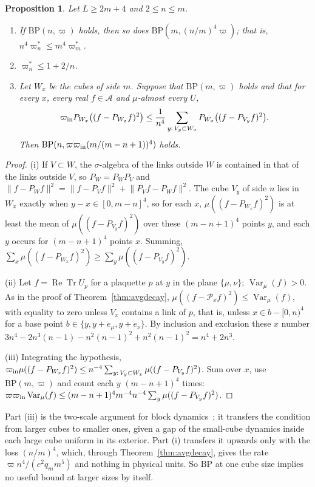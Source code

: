 \documentclass[aps,prd,twocolumn,superscriptaddress,nofootinbib,longbibliography,floatfix,amsmath,amssymb,10pt]{revtex4-2}
\newtheorem{proposition}[theorem]{Proposition}
\theoremstyle{definition}
\theoremstyle{remark}
\newcommand{\ReTr}{\operatorname{Re}\operatorname{Tr}}
\newcommand{\Var}{\operatorname{Var}}
\begin{document}
\begin{proposition}\label{prop:bpscales}
Let $L\ge2m+4$ and $2\le n\le m$.
\begin{enumerate}[label=\textup{(\roman*)},leftmargin=*]
\item If $\mathrm{BP}(n,\varpi)$ holds, then so does $\mathrm{BP}(m,(n/m)^4
\varpi)$; that is, $n^4\varpi^*_n\le m^4\varpi^*_m$.
\item $\varpi^*_n\le1+2/n$.
\item Let $W_x$ be the cubes of side $m$. Suppose that $\mathrm{BP}(m,
\varpi)$ holds and that for every $x$, every real $f\in\mathcal A$ and
$\mu$-almost every $U$,
\[
\varpi_{\rm in}P_{W_x}\bigl((f-P_{W_x}f)^2\bigr)\le\frac1{n^4}\sum_{y:\,V_y
\subset W_x}P_{W_x}\bigl((f-P_{V_y}f)^2\bigr).
\]
Then $\mathrm{BP}(n,\varpi\varpi_{\rm in}(m/(m-n+1))^4)$ holds.
\end{enumerate}
\end{proposition}

\begin{proof}
(i) If $V\subset W$, the $\sigma$-algebra of the links outside $W$ is
contained in that of the links outside $V$, so $P_W=P_WP_V$ and
$\lVert f-P_Wf\rVert^2=\lVert f-P_Vf\rVert^2+\lVert P_Vf-P_Wf\rVert^2$. The
cube $V_y$ of side $n$ lies in $W_x$ exactly when $y-x\in[0,m-n]^4$, so
for each $x$, $\mu((f-P_{W_x}f)^2)$ is at least the mean of $\mu((f-P_{V_y}
f)^2)$ over these $(m-n+1)^4$ points $y$, and each $y$ occurs for
$(m-n+1)^4$ points $x$. Summing, $\sum_x\mu((f-P_{W_x}f)^2)\ge\sum_y\mu((f-
P_{V_y}f)^2)$.

(ii) Let $f=\ReTr U_p$ for a plaquette $p$ at $y$ in the plane $\{\mu,\nu
\}$; $\Var_\mu(f)>0$. As in the proof of Theorem~\ref{thm:avgdecay},
$\mu((f-\mathcal P_xf)^2)\le\Var_\mu(f)$, with equality to zero unless $V_x$
contains a link of $p$, that is, unless $x\in b-[0,n)^4$ for a base point
$b\in\{y,y+e_\mu,y+e_\nu\}$. By inclusion and exclusion these $x$ number
$3n^4-2n^3(n-1)-n^2(n-1)^2+n^2(n-1)^2=n^4+2n^3$.

(iii) Integrating the hypothesis, $\varpi_{\rm in}\mu((f-P_{W_x}f)^2)\le n^{-4}
\sum_{y:\,V_y\subset W_x}\mu((f-P_{V_y}f)^2)$. Sum over $x$, use
$\mathrm{BP}(m,\varpi)$ and count each $y$ $(m-n+1)^4$ times:
$\varpi\varpi_{\rm in}\Var_\mu(f)\le(m-n+1)^4m^{-4}n^{-4}\sum_y\mu((f-
P_{V_y}f)^2)$.
\end{proof}

Part (iii) is the two-scale argument for block dynamics~\cite{Mar99}; it
transfers the condition from larger cubes to smaller ones, given a gap of
the small-cube dynamics inside each large cube uniform in its exterior.
Part (i) transfers it upwards only with the loss $(n/m)^4$, which, through
Theorem~\ref{thm:avgdecay}, gives the rate $\varpi n^4/(e^2q_mm^5)$ and
nothing in physical units. So $\mathrm{BP}$ at one cube size implies no
useful bound at larger sizes by itself.
\end{document}
